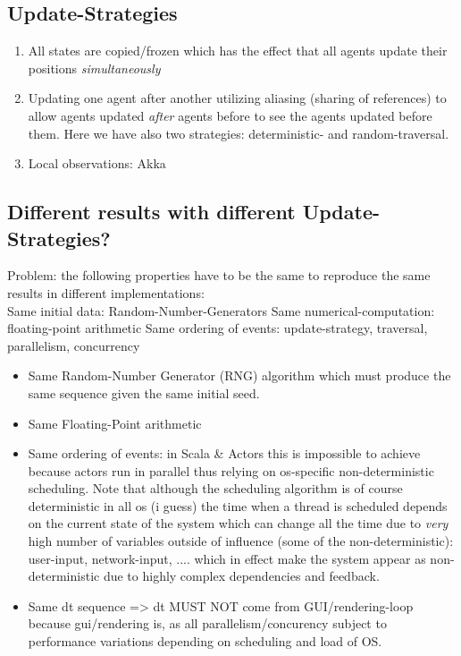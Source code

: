 \subsection{Update-Strategies}
\begin{enumerate}
\item All states are copied/frozen which has the effect that all agents update their positions \textit{simultaneously}
\item Updating one agent after another utilizing aliasing (sharing of references) to allow agents updated \textit{after} agents before to see the agents updated before them. Here we have also two strategies: deterministic- and random-traversal.
\item Local observations: Akka
\end{enumerate}

\subsection{Different results with different Update-Strategies?}
Problem: the following properties have to be the same to reproduce the same results in different implementations: \\

Same initial data: Random-Number-Generators
Same numerical-computation: floating-point arithmetic
Same ordering of events: update-strategy, traversal, parallelism, concurrency

\begin{itemize}
\item Same Random-Number Generator (RNG) algorithm which must produce the same sequence given the same initial seed.
\item Same Floating-Point arithmetic
\item Same ordering of events: in Scala \& Actors this is impossible to achieve because actors run in parallel thus relying on os-specific non-deterministic scheduling. Note that although the scheduling algorithm is of course deterministic in all os (i guess) the time when a thread is scheduled depends on the current state of the system which can change all the time due to \textit{very} high number of variables outside of influence (some of the non-deterministic): user-input, network-input, .... which in effect make the system appear as non-deterministic due to highly complex dependencies and feedback.
\item Same dt sequence => dt MUST NOT come from GUI/rendering-loop because gui/rendering is, as all parallelism/concurency subject to performance variations depending on scheduling and load of OS.
\end{itemize}

